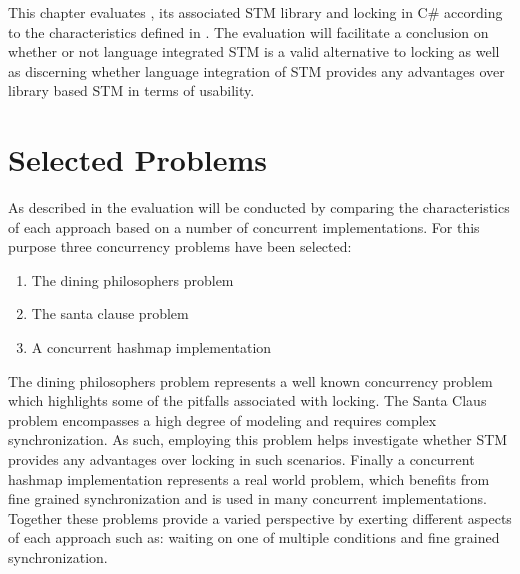 \makeatletter {}\makeatother
{}
This chapter evaluates \stmname, its associated \ac{STM} library and locking in C\# according to the characteristics defined in \cite[p. 15-21]{dpt907e14trending}. The evaluation will facilitate a conclusion on whether or not language integrated \ac{STM} is a valid alternative to locking as well as discerning whether language integration of \ac{STM} provides any advantages over library based \ac{STM} in terms of usability.
\label{chap:evaluation}
\section{Selected Problems}
As described in  the evaluation will be conducted by comparing the characteristics of each approach based on a number of concurrent implementations. For this purpose three concurrency problems have been selected:
\begin{enumerate}
\item The dining philosophers problem\cite[p. 673]{hoare1978communicating}
\item The santa clause problem\cite{trono1994new}
\item A concurrent hashmap implementation\cite[p. 253]{cormen2009introduction}
\end{enumerate}
The dining philosophers problem represents a well known concurrency problem which highlights some of the pitfalls associated with locking. The Santa Claus problem encompasses a high degree of modeling and requires complex synchronization. As such, employing this problem helps investigate whether \ac{STM} provides any advantages over locking in such scenarios. Finally a concurrent hashmap implementation represents a real world problem, which benefits from fine grained synchronization and is used in many concurrent implementations. Together these problems provide a varied perspective by exerting different aspects of each approach such as: waiting on one of multiple conditions and fine grained synchronization.

